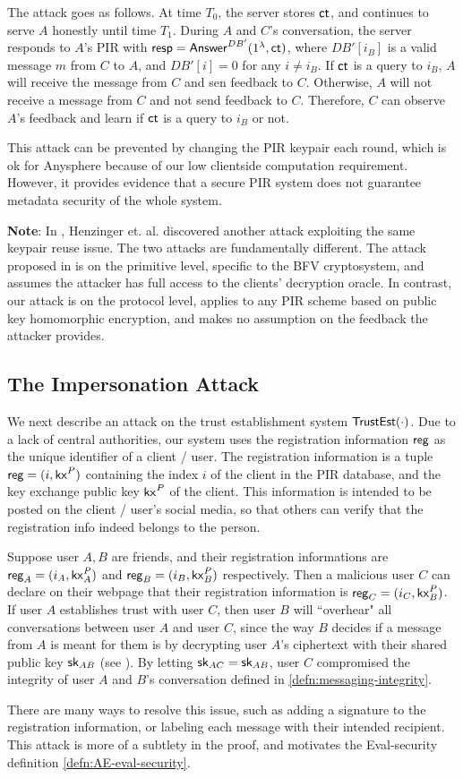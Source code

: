 The attack goes as follows. At time $T_0$, the server stores $\mathsf{ct}$, and continues to serve $A$ honestly until time $T_1$. During $A$ and $C$'s conversation, the server responds to $A$'s PIR with $\mathsf{resp} = \mathsf{Answer}^{DB'}(1^{\lambda}, \mathsf{ct})$, where $DB'[i_B]$ is a valid message $m$ from $C$ to $A$, and $DB'[i] = 0$ for any $i \neq i_B$. If $\mathsf{ct}$ is a query to $i_B$, $A$ will receive the message from $C$ and sen feedback to $C$. Otherwise, $A$ will not receive a message from $C$ and not send feedback to $C$. Therefore, $C$ can observe $A$'s feedback and learn if $\mathsf{ct}$ is a query to $i_B$ or not.

This attack can be prevented by changing the PIR keypair each round, which is ok for Anysphere because of our low clientside computation requirement. However, it provides evidence that a secure PIR system does not guarantee metadata security of the whole system.

\textbf{Note}: In \cite{henry2022simplepir}, Henzinger et. al. discovered another attack exploiting the same keypair reuse issue. The two attacks are fundamentally different. The attack proposed in \cite{henry2022simplepir} is on the primitive level, specific to the BFV cryptosystem, and assumes the attacker has full access to the clients' decryption oracle. In contrast, our attack is on the protocol level, applies to any PIR scheme based on public key homomorphic encryption, and makes no assumption on the feedback the attacker provides.

\subsection{The Impersonation Attack} 
We next describe an attack on the trust establishment system $\mathsf{TrustEst}(\cdot)$. Due to a lack of central authorities, our system uses the registration information $\mathsf{reg}$ as the unique identifier of a client / user. The registration information is a tuple $\mathsf{reg} = (i, \mathsf{kx}^P)$ containing the index $i$ of the client in the PIR database, and the key exchange public key $\mathsf{kx}^P$ of the client. This information is intended to be posted on the client / user's social media, so that others can verify that the registration info indeed belongs to the person.

Suppose user $A, B$ are friends, and their registration informations are $\mathsf{reg}_A = (i_A, \mathsf{kx}^P_A)$ and $\mathsf{reg}_B = (i_B, \mathsf{kx}^P_B)$ respectively. Then a malicious user $C$ can declare on their webpage that their registration information is $\mathsf{reg}_C = (i_C, \mathsf{kx}^P_B)$. If user $A$ establishes trust with user $C$, then user $B$ will ``overhear" all conversations between user $A$ and user $C$, since the way $B$ decides if a message from $A$ is meant for them is by decrypting user $A$'s ciphertext with their shared public key ${\mathsf{sk}}_{AB}$ (see \cite[Figure 3]{whitepaper}). By letting ${\mathsf{sk}}_{AC} = {\mathsf{sk}}_{AB}$, user $C$ compromised the integrity of user $A$ and $B$'s conversation defined in \cref{defn:messaging-integrity}.

There are many ways to resolve this issue, such as adding a signature to the registration information, or labeling each message with their intended recipient. This attack is more of a subtlety in the proof, and motivates the Eval-security definition \cref{defn:AE-eval-security}.